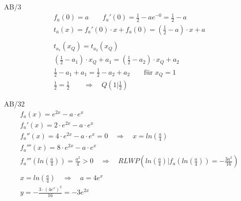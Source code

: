 \begin{exercise}{AB/3}
  \begin{gather*}
    f_a(0) = a \qquad f_a'(0) = \frac{1}{2} - ae^{-0} = \frac{1}{2} - a \\
    t_a(x) = f_a'(0) \cdot x + f_a(0) = (\frac{1}{2} - a) \cdot x + a \\\\
    t_{a_1}(x_Q) = t_{a_2}(x_Q) \\
    (\frac{1}{2} - a_1) \cdot x_Q + a_1 = (\frac{1}{2} - a_2) \cdot x_Q + a_2\\
    \frac{1}{2} - a_1 + a_1 = \frac{1}{2} - a_2 + a_2 \qquad \text{für } x_Q = 1 \\
    \frac{1}{2} = \frac{1}{2} \qquad\Rightarrow\quad Q(1|\frac{1}{2})
  \end{gather*}
\end{exercise}
\begin{exercise}{AB/32}
  \begin{gather*}
    f_a(x) = e^{2x} - a \cdot e^x \\
    f_a'(x) = 2 \cdot e^{2x} - a \cdot e^x \\
    f_a''(x) = 4 \cdot e^{2x} - a \cdot e^x = 0 \quad\Rightarrow\quad x = ln(\frac{a}{4}) \\
    f_a'''(x) = 8 \cdot e^{2x} - a \cdot e^x \\
    f_a'''(ln(\frac{a}{4})) = \frac{a^2}{4} > 0 \quad\Rightarrow\quad RLWP(ln(\frac{a}{4})|f_a(ln(\frac{a}{4})) = -\frac{3a^2}{16}) \\\\
    x = ln(\frac{a}{4}) \quad\Rightarrow\quad a = 4e^x \\
    y = -\frac{3 \cdot (4e^x)^2}{16} = -3e^{2x}
  \end{gather*}
\end{exercise}
